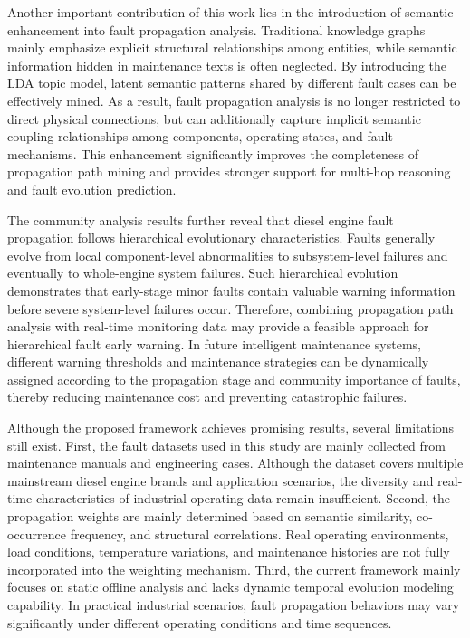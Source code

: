 \documentclass[conference]{IEEEconf}
\begin{document}
Another important contribution of this work lies in the introduction of semantic enhancement into fault propagation analysis. Traditional knowledge graphs mainly emphasize explicit structural relationships among entities, while semantic information hidden in maintenance texts is often neglected. By introducing the LDA topic model, latent semantic patterns shared by different fault cases can be effectively mined. As a result, fault propagation analysis is no longer restricted to direct physical connections, but can additionally capture implicit semantic coupling relationships among components, operating states, and fault mechanisms. This enhancement significantly improves the completeness of propagation path mining and provides stronger support for multi-hop reasoning and fault evolution prediction.

The community analysis results further reveal that diesel engine fault propagation follows hierarchical evolutionary characteristics. Faults generally evolve from local component-level abnormalities to subsystem-level failures and eventually to whole-engine system failures. Such hierarchical evolution demonstrates that early-stage minor faults contain valuable warning information before severe system-level failures occur. Therefore, combining propagation path analysis with real-time monitoring data may provide a feasible approach for hierarchical fault early warning. In future intelligent maintenance systems, different warning thresholds and maintenance strategies can be dynamically assigned according to the propagation stage and community importance of faults, thereby reducing maintenance cost and preventing catastrophic failures.

Although the proposed framework achieves promising results, several limitations still exist. First, the fault datasets used in this study are mainly collected from maintenance manuals and engineering cases. Although the dataset covers multiple mainstream diesel engine brands and application scenarios, the diversity and real-time characteristics of industrial operating data remain insufficient. Second, the propagation weights are mainly determined based on semantic similarity, co-occurrence frequency, and structural correlations. Real operating environments, load conditions, temperature variations, and maintenance histories are not fully incorporated into the weighting mechanism. Third, the current framework mainly focuses on static offline analysis and lacks dynamic temporal evolution modeling capability. In practical industrial scenarios, fault propagation behaviors may vary significantly under different operating conditions and time sequences.
\end{document}
